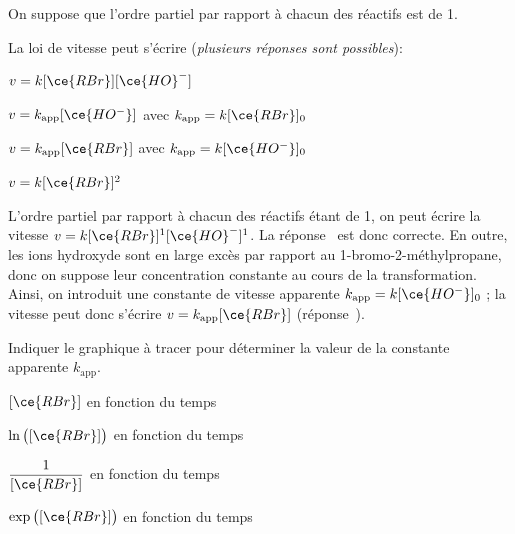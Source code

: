 


\begin{enonce}
On suppose que l'ordre partiel par rapport à chacun des réactifs est de 1. 

La loi de vitesse peut s'écrire ({\itshape plusieurs réponses sont possibles}): 

	\begin{listeQCM2Colonnes}
	\item $v=k[\ce{RBr}][\ce{HO}^-]$
	\item $v=k_\text{app}[\ce{HO^-}]$ avec $k_\text{app} = k[\ce{RBr}]_0$
	\item $v=k_\text{app}[\ce{RBr}]$ avec $k_\text{app} = k[\ce{HO^-}]_0$
	\item $v=k[\ce{RBr}]^2$
	\end{listeQCM2Colonnes}
	
\end{enonce}


\begin{corrige}
L'ordre partiel par rapport à chacun des réactifs étant de 1, on peut écrire la vitesse $v=k[\ce{RBr}]^1[\ce{HO}^-]^1$. La réponse~\reponseA{} est donc correcte. En outre, les ions hydroxyde sont en large excès par rapport au 1-bromo-2-méthylpropane, donc on suppose leur concentration constante au cours de la transformation. Ainsi, on introduit une constante de vitesse apparente $k_\text{app} = k[\ce{HO^-}]_0$ ; la vitesse peut donc s'écrire $v=k_\text{app}[\ce{RBr}]$ (réponse~\reponseC{}).
\end{corrige}




\smallskip

\begin{enonce}
Indiquer le graphique à tracer pour déterminer la valeur de la constante apparente $k_\text{app}$.

	\begin{listeQCM1Colonne}
	\item $[\ce{RBr}]$ en fonction du temps
	\item $\ln \big ([\ce{RBr}]\big )$ en fonction du temps
	\item $\dfrac{1}{[\ce{RBr}]}$ en fonction du temps
	\item $\exp \big([\ce{RBr}]\big)$ en fonction du temps
	\end{listeQCM1Colonne}

\end{enonce}

